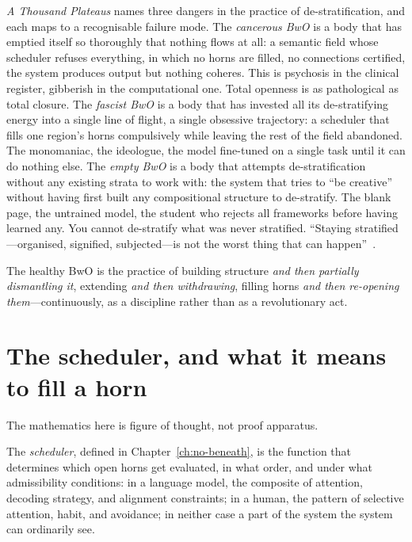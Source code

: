 \emph{A Thousand Plateaus} names three dangers in the practice of de-stratification, and each maps to a recognisable failure mode. The \emph{cancerous BwO} is a body that has emptied itself so thoroughly that nothing flows at all: a semantic field whose scheduler refuses everything, in which no horns are filled, no connections certified, the system produces output but nothing coheres. This is psychosis in the clinical register, gibberish in the computational one. Total openness is as pathological as total closure. The \emph{fascist BwO} is a body that has invested all its de-stratifying energy into a single line of flight, a single obsessive trajectory: a scheduler that fills one region's horns compulsively while leaving the rest of the field abandoned. The monomaniac, the ideologue, the model fine-tuned on a single task until it can do nothing else. The \emph{empty BwO} is a body that attempts de-stratification without any existing strata to work with: the system that tries to ``be creative'' without having first built any compositional structure to de-stratify. The blank page, the untrained model, the student who rejects all frameworks before having learned any. You cannot de-stratify what was never stratified. ``Staying stratified---organised, signified, subjected---is not the worst thing that can happen''~\cite[p.~161]{deleuze1987}.

The healthy BwO is the practice of building structure \emph{and then partially dismantling it}, extending \emph{and then withdrawing}, filling horns \emph{and then re-opening them}---continuously, as a discipline rather than as a revolutionary act.

\section{The scheduler, and what it means to fill a horn}

The mathematics here is figure of thought, not proof apparatus.

The \emph{scheduler}, defined in Chapter~\ref{ch:no-beneath}, is the function that determines which open horns get evaluated, in what order, and under what admissibility conditions: in a language model, the composite of attention, decoding strategy, and alignment constraints; in a human, the pattern of selective attention, habit, and avoidance; in neither case a part of the system the system can ordinarily see.

